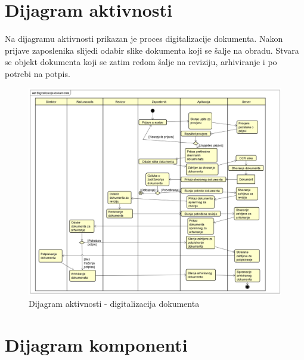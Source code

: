 			\eject 
		
		\section{Dijagram aktivnosti}
			
			

			{Na dijagramu aktivnosti prikazan je proces digitalizacije dokumenta. Nakon prijave zaposlenika slijedi odabir slike dokumenta koji se šalje na obradu. Stvara se objekt dokumenta koji se zatim redom šalje na reviziju, arhiviranje i po potrebi na potpis.}

			 \begin{figure}[H]
			 	\includegraphics[width=\textwidth]{slike/dijagramAktivnosti.png}
			 	\caption{Dijagram aktivnosti - digitalizacija dokumenta}
			 	\label{fig:dijagramAktivnosti}
			 \end{figure}
			\eject
		\section{Dijagram komponenti}
		
		
			 
